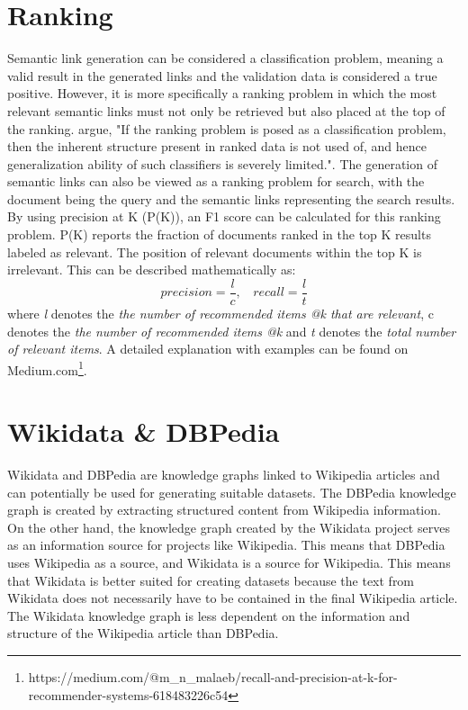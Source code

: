 \section{Ranking}
\label{ranking}
Semantic link generation can be considered a classification problem, meaning a valid result in the generated links and the validation data is considered a true positive. However, it is more specifically a ranking problem in which the most relevant semantic links must not only be retrieved but also placed at the top of the ranking. \cite{Rajaram2003} argue, "If the ranking problem is posed as a classification problem, then the inherent structure present in ranked data is not used of, and hence generalization ability of such classifiers is severely limited.".   The generation of semantic links can also be viewed as a ranking problem for search, with the document being the query and the semantic links representing the search results. \\

By using precision at K (P(K)), \citep{Agichtein2006} an F1 score can be calculated for this ranking problem. P(K) reports the fraction of documents ranked in the top K results labeled as relevant. The position of relevant documents within the top K is irrelevant. This can be described mathematically as:
$$precision = \frac{l}{c},\ \ \ \ recall = \frac{l}{t}$$ where \textit{l} denotes the \textit{the number of recommended items @k that are relevant}, {c} denotes the \textit{the number of recommended items @k} and \textit{t} denotes the \textit{total number of relevant items}. A detailed explanation with examples can be found on Medium.com\footnote{https://medium.com/@m\_n\_malaeb/recall-and-precision-at-k-for-recommender-systems-618483226c54}.\\

\section{Wikidata \& DBPedia}
\label{sectWikidataDBPedia}

Wikidata \citep{vrandevcic2014Wikidata} and DBPedia \citep{dbpedia} are knowledge graphs linked to Wikipedia articles and can potentially be used for generating suitable datasets. The DBPedia knowledge graph is created by extracting structured content from Wikipedia information. On the other hand, the knowledge graph created by the Wikidata project serves as an information source for projects like Wikipedia. This means that DBPedia uses Wikipedia as a source, and Wikidata is a source for Wikipedia. This means that Wikidata is better suited for creating datasets because the text from Wikidata does not necessarily have to be contained in the final Wikipedia article. The Wikidata knowledge graph is less dependent on the information and structure of the Wikipedia article than DBPedia.\\

